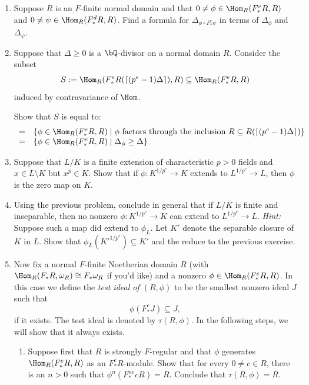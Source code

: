 \documentclass[12pt]{amsart}
\numberwithin{equation}{theorem}
\renewcommand{\:}{\colon}
\theoremstyle{theorem}
\begin{document}
\begin{enumerate}[label=(\arabic*)]
\item Suppose $R$ is an $F$-finite normal domain and that $0 \neq \phi \in \Hom_R(F^e_* R, R)$ and $0 \neq \psi \in \Hom_R(F^d_* R, R)$.  Find a formula for $\Delta_{\phi \circ F^e_* \psi}$ in terms of $\Delta_{\phi}$ and $\Delta_{\psi}$.
\item Suppose that $\Delta \geq 0$ is a $\bQ$-divisor on a normal domain $R$.  Consider the subset
\[
S := \Hom_R(F^e_* R(\lceil (p^e - 1)\Delta \rceil), R) \subseteq \Hom_R(F^e_* R, R)
\]
induced by contravariance of $\Hom$.

Show that $S$ is equal to:
\[
\begin{array}{rl}
= & \{ \phi \in \Hom_R(F^e_* R, R)\;|\; \phi \text{ factors through the inclusion $R \subseteq R(\lceil (p^e-1)\Delta \rceil)$} \} \\
= & \{ \phi \in \Hom_R(F^e_* R, R) \;|\; \Delta_{\phi} \geq \Delta \}
\end{array}
\]
\item Suppose that $L / K$ is a finite extension of characteristic $p > 0$ fields and $x \in L \setminus K$ but $x^p \in K$.  Show that if $\phi : K^{1/p^e} \to K$ extends to $L^{1/p^e} \to L$, then $\phi$ is the zero map on $K$.
\item Using the previous problem, conclude in general that if $L/K$ is finite and inseparable, then no nonzero $\phi : K^{1/p^e} \to K$ can extend to $L^{1/p^e} \to L$.
    \vskip 3pt
    \emph{Hint:} Suppose such a map did extend to $\phi_L$.  Let $K'$ denote the separable closure of $K$ in $L$. Show that $\phi_L(K'^{1/p^e}) \subseteq K'$ and the reduce to the previous exercise.
\item Now fix a normal $F$-finite Noetherian domain $R$ (with $\Hom_R(F_* R, \omega_R) \cong F_* \omega_R$ if you'd like) and a nonzero $\phi \in \Hom_R(F^e_* R, R)$.  In this case we define the \emph{test ideal of $(R, \phi)$} to be the smallest nonzero ideal $J$ such that
    \[
    \phi(F^e_* J) \subseteq J,
    \]
    if it exists.  The test ideal is denoted by $\tau(R, \phi)$.
    In the following steps, we will show that it always exists.
    \begin{enumerate}
    \item Suppose first that $R$ is strongly $F$-regular and that $\phi$ generates $\Hom_R(F^e_* R, R)$ as an $F^e_* R$-module.  Show that for every $0 \neq c \in R$, there is an $n > 0$ such that $\phi^n(F^{ne}_* cR) = R$.  Conclude that $\tau(R, \phi) = R$.
        \vskip 3pt

\end{enumerate}
\end{enumerate}
\end{document}
